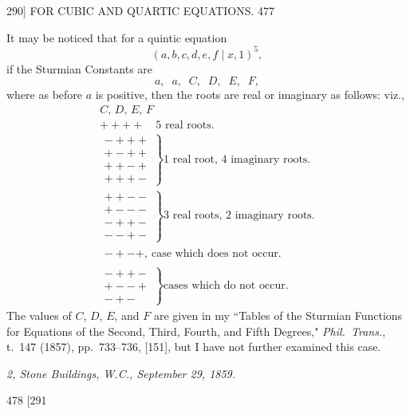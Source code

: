\documentclass[11pt]{article}
\begin{document}
\begin{center}
\textsc{290]} \hfill FOR CUBIC AND QUARTIC EQUATIONS. \hfill 477
\end{center}

It may be noticed that for a quintic equation
\[ (a,b,c,d,e,f\mid x,1)^{5}, \]
if the Sturmian Constants are
\[ a,\;\; a,\;\; C,\;\; D,\;\; E,\;\; F, \]
where as before $a$ is positive, then the roots are real or imaginary as follows: viz.,
\[ \begin{array}{l}
C,\, D,\, E,\, F\\
++++\quad 5\text{ real roots.}\\[1ex]
\left.\begin{array}{l}
-+++ \\
+-++ \\
++-+ \\
+++-
\end{array}\right\} 1 \text{ real root, 4 imaginary roots.}\\[3ex]
\left.\begin{array}{l}
++-- \\
+--- \\
-++- \\
--+-
\end{array}\right\} 3 \text{ real roots, 2 imaginary roots.}\\[3ex]
\begin{array}{l}
-+-+,\ \text{case which does not occur.}
\end{array}\\[1ex]
\left.\begin{array}{l}
-++- \\
+--+ \\
-+-
\end{array}\right\} \text{cases which do not occur.}
\end{array} \]
The values of $C$, $D$, $E$, and $F$ are given in my ``Tables of the Sturmian Functions
for Equations of the Second, Third, Fourth, and Fifth Degrees," \textit{Phil.\ Trans.}, t.~147
(1857), pp.~733--736, [151], but I have not further examined this case.

\smallskip

\hfill\textit{2, Stone Buildings, W.C., September 29, 1859.}

\vfill

\newpage
\begin{center}
478 \hfill \textsc{[291}
\end{center}
\end{document}
